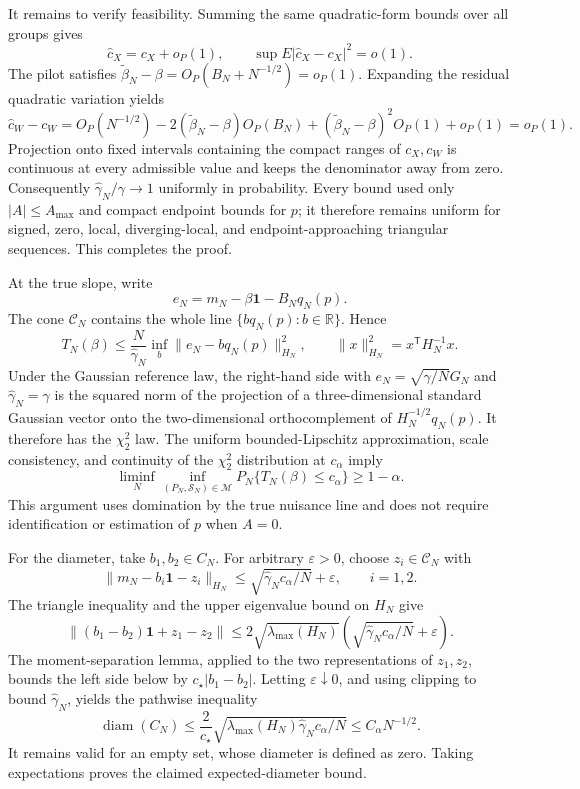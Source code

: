 It remains to verify feasibility.  Summing the same quadratic-form bounds over all groups gives
\[
 \widehat c_X=c_X+o_P(1),
 \qquad \sup E|\widehat c_X-c_X|^2=o(1).
\]
The pilot satisfies \(\widetilde\beta_N-\beta=O_P(B_N+N^{-1/2})=o_P(1)\).  Expanding the residual quadratic variation yields
\[
 \widehat c_W-c_W
 =O_P(N^{-1/2})
 -2(\widetilde\beta_N-\beta)O_P(B_N)
 +(\widetilde\beta_N-\beta)^2O_P(1)+o_P(1)=o_P(1).
\]
Projection onto fixed intervals containing the compact ranges of \(c_X,c_W\) is continuous at every admissible value and keeps the denominator away from zero.  Consequently \(\widehat\gamma_N/\gamma\to1\) uniformly in probability.  Every bound used only \(|A|\le A_{\max}\) and compact endpoint bounds for \(p\); it therefore remains uniform for signed, zero, local, diverging-local, and endpoint-approaching triangular sequences.  This completes the proof.

At the true slope, write
\[
 e_N=m_N-\beta\mathbf1-B_Nq_N(p).
\]
The cone \(\mathcal C_N\) contains the whole line \(\{bq_N(p):b\in\mathbb R\}\).  Hence
\[
 T_N(\beta)
 \le \frac{N}{\widehat\gamma_N}
 \inf_b\|e_N-bq_N(p)\|_{H_N}^2,
 \qquad \|x\|_{H_N}^2=x^{\mathsf T}H_N^{-1}x.
\]
Under the Gaussian reference law, the right-hand side with \(e_N=\sqrt{\gamma/N}G_N\) and \(\widehat\gamma_N=\gamma\) is the squared norm of the projection of a three-dimensional standard Gaussian vector onto the two-dimensional orthocomplement of \(H_N^{-1/2}q_N(p)\).  It therefore has the \(\chi^2_2\) law.  The uniform bounded-Lipschitz approximation, scale consistency, and continuity of the \(\chi^2_2\) distribution at \(c_\alpha\) imply
\[
 \liminf_N\inf_{(P_N,\mathcal S_N)\in\mathcal M}
 P_N\{T_N(\beta)\le c_\alpha\}\ge1-\alpha.
\]
This argument uses domination by the true nuisance line and does not require identification or estimation of \(p\) when \(A=0\).

For the diameter, take \(b_1,b_2\in C_N\).  For arbitrary \(\varepsilon>0\), choose \(z_i\in\mathcal C_N\) with
\[
 \|m_N-b_i\mathbf1-z_i\|_{H_N}
 \le \sqrt{\widehat\gamma_Nc_\alpha/N}+\varepsilon,
 \qquad i=1,2.
\]
The triangle inequality and the upper eigenvalue bound on \(H_N\) give
\[
 \|(b_1-b_2)\mathbf1+z_1-z_2\|
 \le2\sqrt{\lambda_{\max}(H_N)}
 \left(\sqrt{\widehat\gamma_Nc_\alpha/N}+\varepsilon\right).
\]
The moment-separation lemma, applied to the two representations of \(z_1,z_2\), bounds the left side below by \(c_\star|b_1-b_2|\).  Letting \(\varepsilon\downarrow0\), and using clipping to bound \(\widehat\gamma_N\), yields the pathwise inequality
\[
 \operatorname{diam}(C_N)
 \le \frac{2}{c_\star}
 \sqrt{\lambda_{\max}(H_N)\widehat\gamma_Nc_\alpha/N}
 \le C_\alpha N^{-1/2}.
\]
It remains valid for an empty set, whose diameter is defined as zero.  Taking expectations proves the claimed expected-diameter bound.

